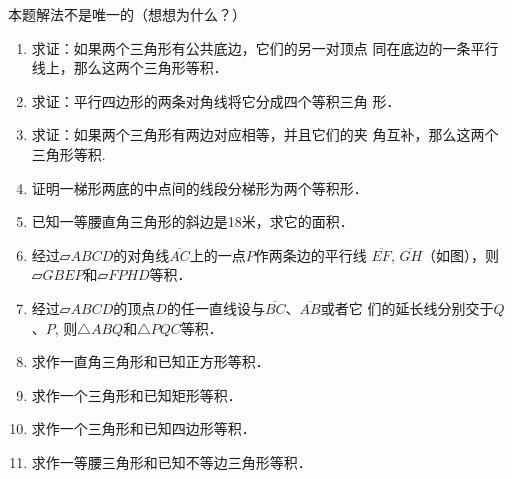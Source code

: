 \begin{rmk}
    本题解法不是唯一的（想想为什么？）
\end{rmk}

\begin{ex}
\begin{enumerate}
    \item 求证：如果两个三角形有公共底边，它们的另一对顶点
    同在底边的一条平行线上，那么这两个三角形等积．
    \item 求证：平行四边形的两条对角线将它分成四个等积三角
    形．
    \item 求证：如果两个三角形有两边对应相等，并且它们的夹
    角互补，那么这两个三角形等积.
    \item 证明一梯形两底的中点间的线段分梯形为两个等积形．
    \item 已知一等腰直角三角形的斜边是18米，求它的面积．
    \item 经过$\parallelogram ABCD$的对角线$\overline{AC}$上的一点$P$作两条边的平行线
    $\overline{EF}$, $\overline{GH}$（如图），则$\parallelogram GBEP$和$\parallelogram FPHD$等积．
    \item 经过$\parallelogram ABCD$的顶点$D$的任一直线设与$\overline{BC}$、$\overline{AB}$或者它
    们的延长线分别交于$Q$、$P$, 则$\triangle ABQ$和$\triangle PQC$等积．
    \item 求作一直角三角形和已知正方形等积．
    \item 求作一个三角形和已知矩形等积．
    \item 求作一个三角形和已知四边形等积．
    \item 求作一等腰三角形和已知不等边三角形等积．
\end{enumerate}
\end{ex}

